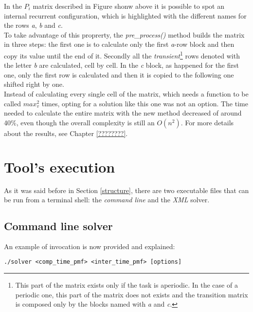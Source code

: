 In the \( P_{i} \) matrix described in Figure shonw above it is possible to spot an internal recurrent configuration, which is highlighted with the different names for the rows \emph{a}, \emph{b} and \emph{c}.\\
To take advantage of this proprerty, the \emph{pre\_process()} method builds the matrix in three steps: the first one is to calculate only the first \emph{a}-row block and then copy its value until the end of it. Secondly all the \emph{transient}\footnote{This part of the matrix exists only if the task is aperiodic. In the case of a periodic one, this part of the matrix does not exists and the transition matrix is composed only by the blocks named with \emph{a} and \emph{c}.} rows denoted with the letter \emph{b} are calculated, cell by cell. In the \emph{c} block, as happened for the first one, only the first row is calculated and then it is copied to the following one shifted right by one.\\
Instead of calculating every single cell of the matrix, which needs a function to be called \( max_{v}^{2} \) times, opting for a solution like this one was not an option. The time needed to calculate the entire matrix with the new method decreased of around 40\%, even though the overall complexity is still an \( O(n^{2}) \). For more details about the results, see Chapter \ref{????????}.
%
% 

\section{Tool's execution}
As it was said before in Section \ref{structure}, there are two executable files that can be run from a terminal shell: the \emph{command line} and the \emph{XML} solver.

\subsection{Command line solver}
An example of invocation is now provided and explained:
\begin{lstlisting}[frame=bt, numbers=none]
  ./solver <comp_time_pmf> <inter_time_pmf> [options]
\end{lstlisting}    

